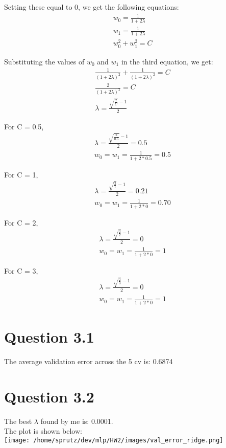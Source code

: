 \documentclass{article}
\begin{document}
Setting these equal to 0, we get the following equations:
\begin{align*}
    w_0 = \frac{1}{1 + 2\lambda}\\
    w_1 = \frac{1}{1 + 2\lambda}\\
    w_0^2 + w_1^2 = C
\end{align*}

Substituting the values of $w_0$ and $w_1$ in the third equation, we get:
\begin{align*}
    \frac{1}{(1 + 2\lambda)^2} + \frac{1}{(1 + 2\lambda)^2} = C\\
    \frac{2}{(1 + 2\lambda)^2} = C\\
    \lambda = \frac{\sqrt{\frac{2}{C}}-1}{2}
\end{align*}

For C = 0.5,
\begin{align}
    \lambda = \frac{\sqrt{\frac{2}{0.5}}-1}{2} = 0.5\\
    w_0 = w_1 = \frac{1}{1 + 2*0.5} = 0.5
\end{align}

For C = 1,
\begin{align}
    \lambda = \frac{\sqrt{\frac{2}{1}}-1}{2} = 0.21\\
    w_0 = w_1 = \frac{1}{1 + 2*0} = 0.70
\end{align}

For C = 2,
\begin{align}
    \lambda = \frac{\sqrt{\frac{2}{2}}-1}{2} = 0\\
    w_0 = w_1 = \frac{1}{1 + 2*0} = 1
\end{align}

For C = 3,
\begin{align}
    \lambda = \frac{\sqrt{\frac{2}{3}}-1}{2} = 0\\
    w_0 = w_1 = \frac{1}{1 + 2*0} = 1
\end{align}



\section*{Question 3.1}
The average validation error across the 5 cv is: 0.6874

\section*{Question 3.2}
The best $\lambda$ found by me is: 0.0001.\\
The plot is shown below:\\
\texttt{[image: /home/sprutz/dev/mlp/HW2/images/val\_error\_ridge.png]}
\end{document}
